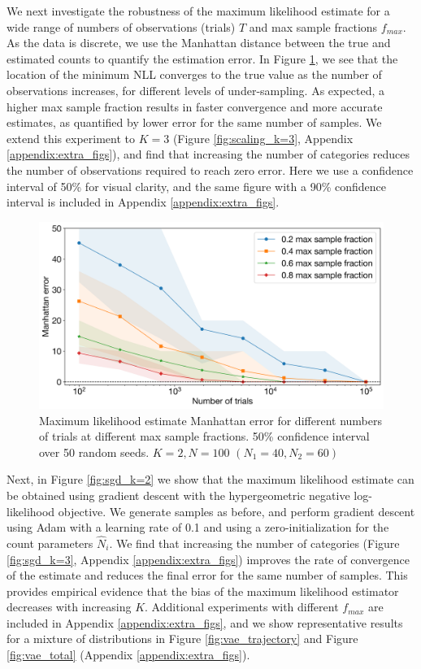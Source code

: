 \documentclass{article}
\theoremstyle{plain}
\theoremstyle{definition}
\theoremstyle{remark}
\begin{document}
We next investigate the robustness of the maximum likelihood estimate for a wide range of numbers of observations (trials) $T$ and max sample fractions $f_{max}$. As the data is discrete, we use the Manhattan distance between the true and estimated counts to quantify the estimation error. In Figure \ref{fig:scaling_k=2}, we see that the location of the minimum NLL converges to the true value as the number of observations increases, for different levels of under-sampling.  As expected, a higher max sample fraction results in faster convergence and more accurate estimates, as quantified by lower error for the same number of samples. We extend this experiment to $K=3$ (Figure \ref{fig:scaling_k=3}, Appendix \ref{appendix:extra_figs}), and find that increasing the number of categories reduces the number of observations required to reach zero error. Here we use a confidence interval of 50\% for visual clarity, and the same figure with a 90\% confidence interval is included in Appendix \ref{appendix:extra_figs}.

\begin{figure}[h!]
    \centering
    \includegraphics[width=1\linewidth]{scaling_k2_50ci.png}
    \caption{Maximum likelihood estimate Manhattan error for different numbers of trials at different max sample fractions. 50\% confidence interval over 50 random seeds. $K=2, N=100$ $(N_1=40, N_2=60)$}
    \label{fig:scaling_k=2}
\end{figure}

Next, in Figure \ref{fig:sgd_k=2} we show that the maximum likelihood estimate can be obtained using gradient descent with the hypergeometric negative log-likelihood objective. We generate samples as before, and perform gradient descent using Adam with a learning rate of 0.1 and using a zero-initialization for the count parameters $\hat{N}_i$. We find that increasing the number of categories (Figure \ref{fig:sgd_k=3}, Appendix \ref{appendix:extra_figs}) improves the rate of convergence of the estimate and reduces the final error for the same number of samples. This provides empirical evidence that the bias of the maximum likelihood estimator decreases with increasing $K$. Additional experiments with different $f_{max}$ are included in Appendix \ref{appendix:extra_figs}, and we show representative results for a mixture of distributions in Figure \ref{fig:vae_trajectory} and Figure \ref{fig:vae_total} (Appendix \ref{appendix:extra_figs}).
\end{document}
